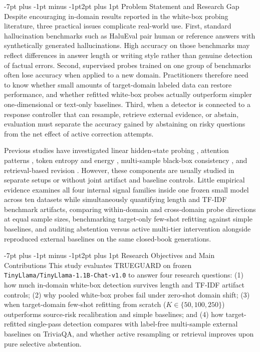 \documentclass[10pt,twocolumn,letterpaper]{article}
\makeatletter
\renewcommand{\subsection}{\@startsection{subsection}{2}{\z@}%
  {-7pt plus -1pt minus -1pt}{2pt plus 1pt}%
  {\normalfont\normalsize\itshape\color{black}}}
\makeatother
\begin{document}
\subsection{Problem Statement and Research Gap}
Despite encouraging in-domain results reported in the white-box probing literature, three practical issues complicate real-world use. First, standard hallucination benchmarks such as HaluEval \cite{review29} pair human or reference answers with synthetically generated hallucinations. High accuracy on those benchmarks may reflect differences in answer length or writing style rather than genuine detection of factual errors. Second, supervised probes trained on one group of benchmarks often lose accuracy when applied to a new domain. Practitioners therefore need to know whether small amounts of target-domain labeled data can restore performance, and whether refitted white-box probes actually outperform simpler one-dimensional or text-only baselines. Third, when a detector is connected to a response controller that can resample, retrieve external evidence, or abstain, evaluation must separate the accuracy gained by abstaining on risky questions from the net effect of active correction attempts.

Previous studies have investigated linear hidden-state probing \cite{review27,review28}, attention patterns \cite{review09,review11}, token entropy and energy \cite{review04,review17}, multi-sample black-box consistency \cite{review21}, and retrieval-based revision \cite{review25,review33}. However, these components are usually studied in separate setups or without joint artifact and baseline controls. Little empirical evidence examines all four internal signal families inside one frozen small model across ten datasets while simultaneously quantifying length and TF-IDF benchmark artifacts, comparing within-domain and cross-domain probe directions at equal sample sizes, benchmarking target-only few-shot refitting against simple baselines, and auditing abstention versus active multi-tier intervention alongside reproduced external baselines on the same closed-book generations.

\subsection{Research Objectives and Main Contributions}
This study evaluates TRUEGUARD on frozen \texttt{TinyLlama/TinyLlama-1.1B-Chat-v1.0} to answer four research questions: (1) how much in-domain white-box detection survives length and TF-IDF artifact controls; (2) why pooled white-box probes fail under zero-shot domain shift; (3) when target-domain few-shot refitting from scratch ($K \in \{50, 100, 250\}$) outperforms source-risk recalibration and simple baselines; and (4) how target-refitted single-pass detection compares with label-free multi-sample external baselines on TriviaQA, and whether active resampling or retrieval improves upon pure selective abstention.
\end{document}
